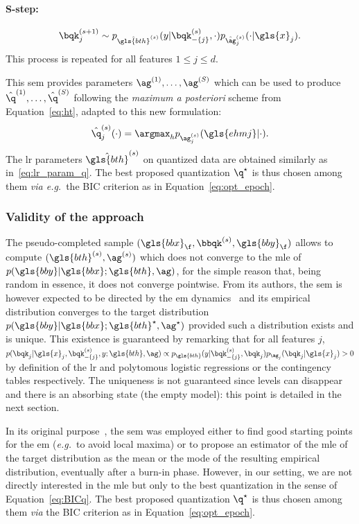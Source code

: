 \paragraph{S-step:}
\begin{equation} \label{eq:q_draw}
\bqk_j^{(s+1)} \sim p_{\hat{\gls{bth}}^{(s)}}(y | \bqk_{-\{j\}}^{(s)}, \cdot) p_{\hat{\ag}_j^{(s)}}(\cdot | \gls{x}_j).
\end{equation}
This process is repeated for all features $1 \leq j \leq d$.

This \gls{sem} provides parameters ${\ag}^{(1)}, \dots, {\ag}^{(S)}$ which can be used to produce $\hat{\q}^{(1)}, \dots, \hat{\q}^{(S)}$ following the \textit{maximum a posteriori} scheme from Equation~\eqref{eq:ht}, adapted to this new formulation:
\[ \hat{\q}_j^{(s)}(\cdot) = \argmax_{h} p_{\ag_j^{(s)}}(\gls{ehmj} | \cdot ) .\]
The \gls{lr} parameters $\hat{\gls{bth}}^{(s)}$ on quantized data are obtained similarly as in~\eqref{eq:lr_param_q}. The best proposed quantization $\q^\star$ is thus chosen among them \textit{via e.g.}\ the BIC criterion as in Equation~\eqref{eq:opt_epoch}.


\subsubsection{Validity of the approach}

The pseudo-completed sample $(\gls{bbx}_{\f}, \bbqk^{(s)}, \gls{bby}_{\f})$ allows to compute $({\gls{bth}}^{(s)},{\ag}^{(s)})$ which does not converge to the \gls{mle} of $p(\gls{bby} | \gls{bbx}; \gls{bth}, \ag)$, for the simple reason that, being random in essence, it does not converge pointwise. From its authors, the \gls{sem} is however expected to be directed by the \gls{em} dynamics~\cite{celeux_sem} and its empirical distribution converges to the target distribution $p(\gls{bby} | \gls{bbx}; \gls{bth}^\star, \ag^\star)$ provided such a distribution exists and is unique. This existence is guaranteed by remarking that for all features $j$, $ p(\bqk_j | \gls{x}_j, \bqk^{(s)}_{-\{j\}}, y; \gls{bth}, \ag) \propto p_{\gls{bth}}(y | \bqk^{(s)}_{-\{j\}}, \bqk_j) p_{\ag_j}(\bqk_j | \gls{x}_j) > 0 $ by definition of the \gls{lr} and polytomous logistic regressions or the contingency tables respectively. The uniqueness is not guaranteed since levels can disappear and there is an absorbing state (the empty model): this point is detailed in the next section.

In its original purpose~\cite{celeux_sem}, the \gls{sem} was employed either to find good starting points for the \gls{em} (\textit{e.g.}\ to avoid local maxima) or to propose an estimator of the \gls{mle} of the target distribution as the mean or the mode of the resulting empirical distribution, eventually after a burn-in phase. However, in our setting, we are not directly interested in the \gls{mle} but only to the best quantization in the sense of Equation~\eqref{eq:BICq}. The best proposed quantization $\q^\star$ is thus chosen among them \textit{via} the BIC criterion as in Equation~\eqref{eq:opt_epoch}.

